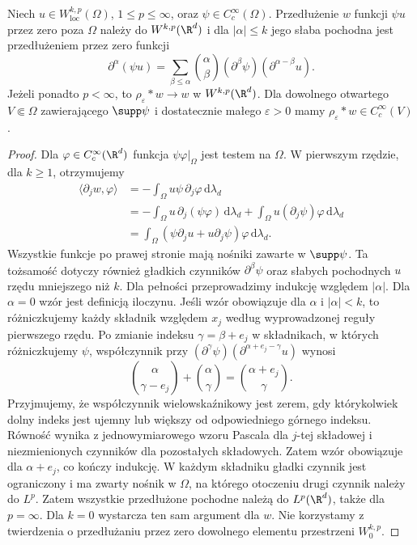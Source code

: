 \begin{lemat}
\label{lem:pde9-compact-product}
Niech $u\in W^{k,p}_{\mathrm{loc}}(\Omega)$,
$1\le p\le\infty$, oraz $\psi\in C_c^\infty(\Omega)$.
Przedłużenie $w$ funkcji $\psi u$ przez zero poza $\Omega$
należy do $W^{k,p}(\R^d)$ i dla $|\alpha|\le k$
jego słaba pochodna jest przedłużeniem przez zero funkcji
\[
 \partial^\alpha(\psi u)=
 \sum_{\beta\le\alpha}\binom{\alpha}{\beta}
 (\partial^\beta\psi)(\partial^{\alpha-\beta}u).
\]
Jeżeli ponadto $p<\infty$, to
$\rho_\varepsilon*w\to w$ w $W^{k,p}(\R^d)$.
Dla dowolnego otwartego $V\Subset\Omega$
zawierającego $\supp\psi$ i dostatecznie małego
$\varepsilon>0$ mamy $\rho_\varepsilon*w\in C_c^\infty(V)$.
\end{lemat}
\begin{proof}
Dla $\varphi\in C_c^\infty(\R^d)$ funkcja
$\psi\varphi|_\Omega$ jest testem na $\Omega$.
W pierwszym rzędzie, dla $k\ge1$, otrzymujemy
\[
 \begin{aligned}
 \langle\partial_j w,\varphi\rangle
 &=-\int_\Omega u\psi\,\partial_j\varphi\,\mathrm d\lambda_d\\
 &=-\int_\Omega u\,\partial_j(\psi\varphi)\,\mathrm d\lambda_d
   +\int_\Omega u(\partial_j\psi)\varphi\,\mathrm d\lambda_d\\
 &=\int_\Omega(\psi\partial_j u+u\partial_j\psi)
 \varphi\,\mathrm d\lambda_d.
 \end{aligned}
\]
Wszystkie funkcje po prawej stronie mają nośniki
zawarte w $\supp\psi$. Ta tożsamość dotyczy również
gładkich czynników $\partial^\beta\psi$ oraz słabych
pochodnych $u$ rzędu mniejszego niż $k$.
Dla pełności przeprowadzimy indukcję względem
$|\alpha|$. Dla $\alpha=0$ wzór jest definicją iloczynu.
Jeśli wzór obowiązuje dla $\alpha$ i $|\alpha|<k$,
to różniczkujemy każdy składnik względem $x_j$
według wyprowadzonej reguły pierwszego rzędu.
Po zmianie indeksu $\gamma=\beta+e_j$ w składnikach,
w których różniczkujemy $\psi$, współczynnik przy
$(\partial^\gamma\psi)
(\partial^{\alpha+e_j-\gamma}u)$ wynosi
\[
 \binom{\alpha}{\gamma-e_j}+\binom{\alpha}{\gamma}
 =\binom{\alpha+e_j}{\gamma}.
\]
Przyjmujemy, że współczynnik wielowskaźnikowy jest
zerem, gdy którykolwiek dolny indeks jest ujemny
lub większy od odpowiedniego górnego indeksu.
Równość wynika z jednowymiarowego wzoru Pascala
dla $j$-tej składowej i niezmienionych czynników
dla pozostałych składowych. Zatem wzór obowiązuje
dla $\alpha+e_j$, co kończy indukcję. W każdym składniku gładki
czynnik jest ograniczony i ma zwarty nośnik w $\Omega$,
na którego otoczeniu drugi czynnik należy do $L^p$.
Zatem wszystkie przedłużone pochodne należą do
$L^p(\R^d)$, także dla $p=\infty$.
Dla $k=0$ wystarcza ten sam argument dla $w$.
Nie korzystamy z twierdzenia o przedłużaniu przez zero
dowolnego elementu przestrzeni $W^{k,p}_0$.


\end{proof}
